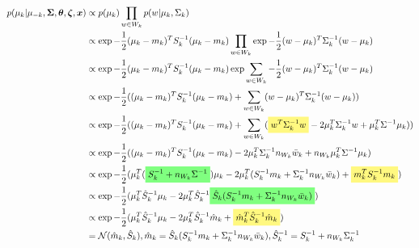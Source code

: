 \documentclass[12pt]{article}
\newcommand{\ghighlight}[1]{%
  \colorbox{green!50}{$\displaystyle#1$}}
\newcommand{\yhighlight}[1]{%
  \colorbox{yellow!50}{$\displaystyle#1$}}
\begin{document}
\begin{equation*}
\begin{split}
p(\mu_k | \mu_{-k}, \bm{\Sigma}, \bm{\theta}, \bm{\zeta}, \bm{x}) & \propto p(\mu_k) \prod_{w \in W_k} p(w | \mu_k, \Sigma_k) \\
& \propto \exp{-\frac{1}{2}(\mu_k - m_k)^T S_k^{-1} (\mu_k - m_k)} \prod_{w \in W_k} \exp{-\frac{1}{2}(w - \mu_k)^T \Sigma_k^{-1} (w - \mu_k)} \\
& \propto \exp{-\frac{1}{2}(\mu_k - m_k)^T S_k^{-1} (\mu_k - m_k)} \exp{\sum_{w \in W_k} -\frac{1}{2}(w - \mu_k)^T \Sigma_k^{-1} (w - \mu_k)} \\
& \propto \exp{-\frac{1}{2}((\mu_k - m_k)^T S_k^{-1} (\mu_k - m_k) + \sum_{w \in W_k} (w - \mu_k)^T \Sigma_k^{-1} (w - \mu_k))} \\
& \propto \exp{-\frac{1}{2}((\mu_k - m_k)^T S_k^{-1} (\mu_k - m_k) + \sum_{w \in W_k}(\yhighlight{w^T\Sigma_k^{-1}w} - 2 \mu_k^T\Sigma_k^{-1}w + \mu_k^T\Sigma^{-1}\mu_k))} \\
& \propto \exp{-\frac{1}{2}((\mu_k - m_k)^T S_k^{-1} (\mu_k - m_k) - 2 \mu_k^T\Sigma_k^{-1}n_{W_k}\bar{w}_k + n_{W_k}\mu_k^T\Sigma^{-1}\mu_k)} \\
& \propto \exp{-\frac{1}{2}(\mu_k^T(\ghighlight{S_k^{-1} + n_{W_k}\Sigma^{-1}})\mu_k - 2\mu_k^T(S_k^{-1}m_k + \Sigma_k^{-1}n_{W_k}\bar{w}_k) + \yhighlight{m_k^TS_k^{-1}m_k})} \\
& \propto \exp{-\frac{1}{2}(\mu_k^T\hat{S}_k^{-1}\mu_k - 2\mu_k^T\hat{S}_k^{-1}\ghighlight{\hat{S}_k(S_k^{-1}m_k + \Sigma_k^{-1}n_{W_k}\bar{w}_k)})} \\
& \propto \exp{-\frac{1}{2}(\mu_k^T\hat{S}_k^{-1}\mu_k - 2\mu_k^T\hat{S}_k^{-1}\hat{m}_k + \yhighlight{\hat{m}_k^T\hat{S}_k^{-1}\hat{m}_k})} \\
& = \mathcal{N}(\hat{m}_k, \hat{S}_k), \hat{m}_k = \hat{S}_k(S_k^{-1}m_k + \Sigma_k^{-1}n_{W_k}\bar{w}_k), \hat{S}_k^{-1} = S_k^{-1} + n_{W_k}\Sigma_k^{-1}
\end{split}
\end{equation*}
\end{document}

